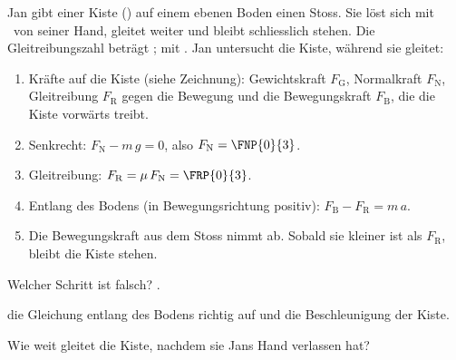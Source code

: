 Jan gibt einer Kiste (\mKO) auf einem ebenen Boden einen Stoss. Sie löst sich mit \vNO\ von seiner Hand, gleitet weiter und bleibt schliesslich stehen. Die Gleitreibungszahl beträgt \muGO;  mit \gO. Jan untersucht die Kiste, während sie gleitet:

\begin{center}
\end{center}

\begin{enumerate}
\item Kräfte auf die Kiste (siehe Zeichnung): Gewichtskraft $F_\mathrm{G}$, Normalkraft $F_\mathrm{N}$, Gleitreibung $F_\mathrm{R}$ gegen die Bewegung und die Bewegungskraft $F_\mathrm{B}$, die die Kiste vorwärts treibt.
\item Senkrecht: $F_\mathrm{N} - m\,g = 0$, also $F_\mathrm{N} = \FNP{0}{3}$.
\item Gleitreibung: $F_\mathrm{R} = \mu\,F_\mathrm{N} = \FRP{0}{3}$.
\item Entlang des Bodens (in Bewegungsrichtung positiv): $F_\mathrm{B} - F_\mathrm{R} = m\,a$.
\item Die Bewegungskraft aus dem Stoss nimmt ab. Sobald sie kleiner ist als $F_\mathrm{R}$, bleibt die Kiste stehen.
\end{enumerate}

\begin{abcliste}
\abc
Welcher Schritt ist falsch? .

\abc
{} die Gleichung entlang des Bodens richtig auf und  die Beschleunigung der Kiste.

\abc
Wie weit gleitet die Kiste, nachdem sie Jans Hand verlassen hat?
\end{abcliste}
